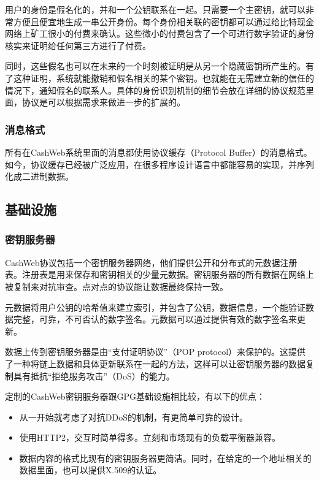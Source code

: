 \documentclass{article}
\begin{document}
用户的身份是假名化的，并和一个公钥联系在一起。只需要一个主密钥，就可以非常方便且便宜地生成一串公开身份。每个身份相关联的密钥都可以通过给比特现金网络上矿工很小的付费来确认。这些微小的付费包含了一个可进行数字验证的身份核实来证明给任何第三方进行了付费。

同时，这些假名也可以在未来的一个时刻被证明是从另一个隐藏密钥所产生的。有了这种证明，系统就能撤销和假名相关的某个密钥。也就能在无需建立新的信任的情况下，通知假名的联系人。具体的身份识别机制的细节会放在详细的协议规范里面，协议是可以根据需求来做进一步的扩展的。

\subsubsection{消息格式}

所有在CashWeb系统里面的消息都使用协议缓存（Protocol Buffer）\supercite{protobufs}的消息格式。如今，协议缓存已经被广泛应用，在很多程序设计语言中都能容易的实现，并序列化成二进制数据。

\subsection{基础设施}

\subsubsection{密钥服务器}

CashWeb协议包括一个密钥服务器网络，他们提供公开和分布式的元数据注册表。注册表是用来保存和密钥相关的少量元数据。密钥服务器的所有数据在网络上被复制来对抗审查。点对点的协议能让数据最终保持一致。

元数据将用户公钥的哈希值来建立索引，并包含了公钥，数据信息，一个能验证数据完整，可靠，不可否认的数字签名。元数据可以通过提供有效的数字签名来更新。

数据上传到密钥服务器是由``支付证明协议''（POP protocol）来保护的。这提供了一种将链上数据和具体更新联系在一起的方法，这样可以让密钥服务器的数据复制具有抵抗``拒绝服务攻击''（DoS）的能力。

定制的CashWeb密钥服务器跟GPG基础设施相比较，有以下的优点：
\begin{itemize}
  \item 从一开始就考虑了对抗DDoS的机制，有更简单可靠的设计。
  \item 使用HTTP2，交互时简单得多。立刻和市场现有的负载平衡器兼容。
  \item 数据内容的格式比现有的密钥服务器更简洁。同时，在给定的一个地址相关的数据里面，也可以提供X.509的认证。
\end{itemize}
\end{document}

